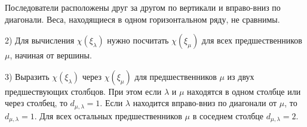Последователи расположены друг за другом по вертикали и вправо-вниз по диагонали. 
Веса, находящиеся в одном горизонтальном ряду, не сравнимы.

2) Для вычисления $ \chi(\xi_{\lambda}) $ нужно посчитать $ \chi(\xi_{\mu}) $ для всех предшественников $\mu$, начиная от вершины.

3) Выразить $ \chi(\xi_{\lambda}) $ через $ \chi(\xi_{\mu}) $ для предшественников $\mu$ из двух предшествующих столбцов. 
При этом если $\lambda$ и $\mu$ находятся в одном столбце или через столбец, то $ d_{\mu, \lambda} = 1 $. 
Если $\lambda$ находится вправо-вниз по диагонали от $\mu$, то $ d_{\mu, \lambda} = 1 $. 
Для всех остальных предшественников $\mu$ в соседнем столбце $ d_{\mu, \lambda} = 2 $.
